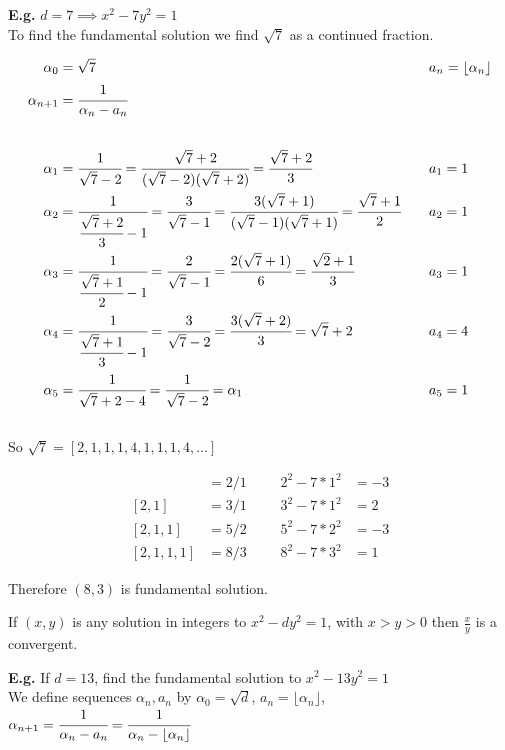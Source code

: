 \documentclass[11pt]{article}
\begin{document}
$ $\\[1em]
\textbf{E.g.} $d=7 \implies x^2-7y^2 = 1$ \\

To find the fundamental solution we find $\sqrt{7}$ as a continued fraction.


\begin{align*}
	\alpha_0 &= \sqrt{7} &&&& a_n=\lfloor \alpha_n \rfloor\\
	\alpha_{n+1} &= \cfrac{1}{\alpha_n - a_n}\\[2em]
	\alpha_1 &= \cfrac{1}{\sqrt{7}-2} = \cfrac{\sqrt{7} +2}{(\sqrt{7}-2)(\sqrt{7}+2)} = \cfrac{\sqrt{7}+2}{3} &&&& a_1 = 1\\
	\alpha_2 &= \cfrac{1}{\cfrac{\sqrt{7} +2 }{3}-1} = \cfrac{3}{\sqrt{7}-1} = \cfrac{3(\sqrt{7}+1)}{(\sqrt{7}-1)(\sqrt{7}+1)} = \cfrac{\sqrt{7}+1}{2} &&&& a_2=1\\
	\alpha_3 &= \cfrac{1}{\cfrac{\sqrt{7}+1}{2}-1} = \cfrac{2}{\sqrt{7}-1} = \cfrac{2(\sqrt{7}+1)}{6} = \cfrac{\sqrt{2}+1}{3} &&&& a_3=1 \\
	\alpha_4 &= \cfrac{1}{\cfrac{\sqrt{7}+1}{3}-1} = \cfrac{3}{\sqrt{7} -2 } = \cfrac{3(\sqrt{7}+2)}{3} = \sqrt{7}+2 &&&& a_4=4\\
	\alpha_5 &= \cfrac{1}{\sqrt{7} + 2 -4} = \cfrac{1}{\sqrt{7}-2} = \alpha_1 &&&& a_5 =1 
\end{align*}
\\[2em]
So $\sqrt{7} = [2,1,1,1,4,1,1,1,4,\dots]$

\begin{align*}
	[2] &= 2/1 &&& 2^2-7*1^2&=-3\\
	[2,1] &=3/1 &&& 3^2 - 7*1^2 &= 2 \\
	[2,1,1] &=5/2 &&& 5^2 -7*2^2 &=-3\\
	[2,1,1,1] &= 8/3 &&&  8^2 - 7*3^2 &= 1
\end{align*}

Therefore $(8,3)$ is fundamental solution.


\begin{proposition}
	If $(x,y)$ is any solution in integers to $x^2 - dy^2 = 1$, with $x>y>0$ then $\frac{x}{y} $ is a convergent.
\end{proposition}

$ $\\
\textbf{E.g.} If $d=13$, find the fundamental solution to $x^2-13y^2 =1$
\\

We define sequences $\alpha_n, a_n $ by $\alpha_0 = \sqrt{d} $, $a_n = \lfloor \alpha_n \rfloor $, $ \alpha_{n+1} = \cfrac{1}{\alpha_n -a_n} = \cfrac{1}{\alpha_n-\lfloor \alpha_n \rfloor}$
\end{document}
